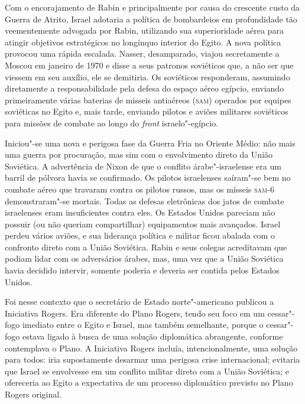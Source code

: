 Com o encorajamento de Rabin e principalmente por causa do crescente
custo da Guerra de Atrito, Israel adotaria a política de bombardeios em
profundidade tão veementemente advogada por Rabin, utilizando sua
superioridade aérea para atingir objetivos estratégicos no longínquo
interior do Egito. A nova política provocou uma rápida escalada. Nasser,
desamparado, viajou secretamente a Moscou em janeiro de 1970 e disse a
seus patronos soviéticos que, a não ser que viessem em seu auxílio, ele
se demitiria. Os soviéticos responderam, assumindo diretamente a
responsabilidade pela defesa do espaço aéreo egípcio, enviando
primeiramente várias baterias de misseis antiaéreos (\textsc{sam}) operados por
equipes soviéticas no Egito e, mais tarde, enviando pilotos e aviões
militares soviéticos para missões de combate ao longo do \textit{front}
israelo"-egípcio.

Iniciou"-se uma nova e perigosa fase da Guerra Fria no Oriente Médio: não
mais uma guerra por procuração, mas sim com o envolvimento direto da
União Soviética. A advertência de Nixon de que o conflito
árabe"-israelense era um barril de pólvora havia se confirmado. Os
pilotos israelenses saíram"-se bem no combate aéreo que travaram contra
os pilotos russos, mas os mísseis \textsc{sam}-6 demonstraram"-se mortais. Todas
as defesas eletrônicas dos jatos de combate israelenses eram
insuficientes contra eles. Os Estados Unidos pareciam não possuir (ou
não queriam compartilhar) equipamentos mais avançados. Israel perdeu
vários aviões, e sua liderança política e militar ficou abalada com o
confronto direto com a União Soviética. Rabin e seus colegas acreditavam
que podiam lidar com os adversários árabes, mas, uma vez que a União
Soviética havia decidido intervir, somente poderia e deveria ser contida
pelos Estados Unidos.

Foi nesse contexto que o secretário de Estado norte"-americano publicou a
Iniciativa Rogers. Era diferente do Plano Rogers, tendo seu foco em um
cessar"-fogo imediato entre o Egito e Israel, mas também semelhante, porque o
cessar"-fogo estava ligado à busca de uma solução diplomática abrangente,
conforme contemplava o Plano. A Iniciativa Rogers incluía,
intencionalmente, uma solução para todos: iria supostamente desarmar uma
perigosa crise internacional; evitaria que Israel se envolvesse em um
conflito militar direto com a União Soviética; e ofereceria ao Egito a
expectativa de um processo diplomático previsto no Plano Rogers
original.

